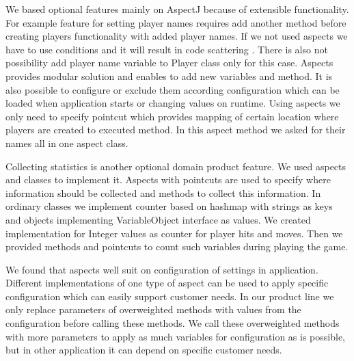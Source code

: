 \documentclass[11pt,slovak,a4paper,twoside]{article}
\begin{document}
We based optional features mainly on AspectJ because of extensible functionality. For example feature for setting player names requires add another method before creating players functionality with added player names. If we not used aspects we have to use conditions and it will result in code scattering \cite{laddad_aspectj_2003}. There is also not possibility add player name variable to Player class only for this case. Aspects provides modular solution and enables to add new variables and method. It is also possible to configure or exclude them according configuration which can be loaded when application starts or changing values on runtime. Using aspects we only need to specify pointcut which provides mapping of certain location where players are created  to executed method. In this aspect method we asked for their names all in one aspect class. 

Collecting statistics is another optional domain product feature. We used aspects and classes to implement it. Aspects with pointcuts are used to specify where information should be collected and methods to collect this information. In ordinary classes we implement counter based on hashmap with strings as keys and objects implementing VariableObject interface as values. We created implementation for Integer values as counter for player hits and moves. Then we provided methods and pointcuts to count such variables during playing the game. 

We found that aspects well suit on configuration of settings in application. Different implementations of one type of aspect can be used to apply specific configuration which can easily support customer needs. In our product line we only replace parameters of overweighted methods with values from the configuration before calling these methods. We call these overweighted methods with more parameters to apply as much variables for configuration as is possible, but in other application it can depend on specific customer needs. 
\end{document}
